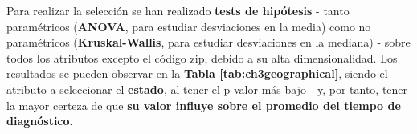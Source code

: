\begin{table}[h]
	\centering
	\captionsetup{belowskip=-15pt}
	\caption{p-valores de los atributos geográficos}
	\label{tab:ch3geographical}
\end{table}

Para realizar la selección se han realizado \textbf{tests de hipótesis} - tanto paramétricos (\textbf{ANOVA}, para estudiar desviaciones en la media) como no paramétricos (\textbf{Kruskal-Wallis}, para estudiar desviaciones en la mediana) - sobre todos los atributos excepto el código zip, debido a su alta dimensionalidad. Los resultados se pueden observar en la \textbf{Tabla \ref{tab:ch3geographical}}, siendo el atributo a seleccionar el \textbf{estado}, al tener el p-valor más bajo - y, por tanto, tener la mayor certeza de que \textbf{su valor influye sobre el promedio del tiempo de diagnóstico}.

